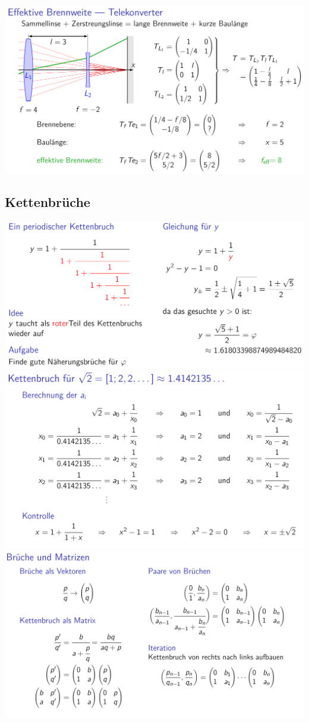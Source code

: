 		 \includegraphics[width=0.8\linewidth]{Bilder/matrixoptik6} \\
		
		 
		 
		 \subsection{Kettenbrüche}
		 \includegraphics[width=0.8\linewidth]{Bilder/kettenbruch1} \\
		 
		 \includegraphics[width=0.8\linewidth]{Bilder/kettenbruch2} \\
		 
		 \includegraphics[width=0.8\linewidth]{Bilder/kettenbruch3} \\
		 
